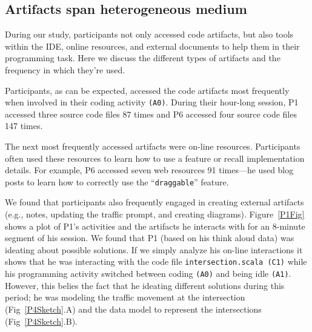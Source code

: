 
\subsection{Artifacts span heterogeneous medium}
During our study, participants not only accessed code artifacts, but also tools within the IDE, online resources, and external documents to help them in their programming task. Here we discuss the different types of artifacts and the frequency in which they're used.

Participants, as can be expected, accessed the code artifacts most frequently when involved in their coding activity \texttt{(A0)}. During their hour-long session, P1 accessed three source code files 87 times and P6 accessed four source code files 147 times. 

The next most frequently accessed artifacts were on-line resources. Participants often used these resources to learn how to use a feature or recall implementation details. For example, P6 accessed seven web resources 91 times---he used blog posts to learn how to correctly use the ``\texttt{draggable}'' feature. 

We found that participants also frequently engaged in creating external artifacts (e.g., notes, updating the traffic prompt, and creating diagrams). Figure~\ref{P1Fig} shows a plot of P1's activities and the artifacts he interacts with for an 8-minute segment of his session. We found that P1 (based on his think aloud data) was ideating about possible solutions. If we simply analyze his on-line interactions it shows that he was interacting with the code file \texttt{intersection.scala (C1)} while his programming activity switched between coding \texttt{(A0)} and being idle \texttt{(A1)}. However, this belies the fact that he ideating different solutions during this period; he was modeling the traffic movement at the intersection (Fig~\ref{P4Sketch}.A) and the data model to represent the  intersections (Fig~\ref{P4Sketch}.B).

